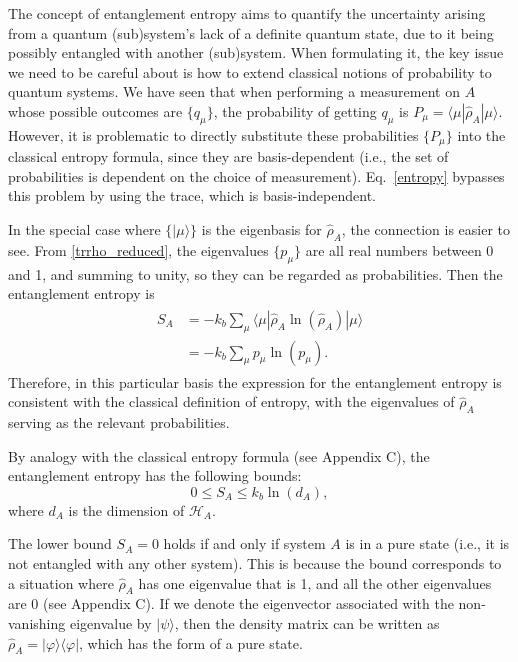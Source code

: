\documentclass[pra,12pt]{revtex4}
\begin{document}
The concept of entanglement entropy aims to quantify the uncertainty
arising from a quantum (sub)system's lack of a definite quantum state,
due to it being possibly entangled with another (sub)system.  When
formulating it, the key issue we need to be careful about is how to
extend classical notions of probability to quantum systems.  We have
seen that when performing a measurement on $A$ whose possible outcomes
are $\{q_\mu\}$, the probability of getting $q_\mu$ is $P_\mu =
\langle \mu | \hat{\rho}_A|\mu\rangle$.  However, it is problematic to
directly substitute these probabilities $\{P_\mu\}$ into the classical
entropy formula, since they are basis-dependent (i.e., the set of
probabilities is dependent on the choice of measurement).
Eq.~\eqref{entropy} bypasses this problem by using the trace, which is
basis-independent.

In the special case where $\{|\mu\rangle\}$ is the eigenbasis for
$\hat{\rho}_A$, the connection is easier to see.  From
\eqref{trrho_reduced}, the eigenvalues $\{p_\mu\}$ are all real numbers
between 0 and 1, and summing to unity, so they can be regarded as
probabilities.  Then the entanglement entropy is
\begin{align}
  \begin{aligned}
    S_A &= -k_b \sum_\mu \langle \mu | \hat{\rho}_A \ln(\hat{\rho}_A) | \mu\rangle  \\
    &= - k_b \sum_\mu p_\mu \ln(p_\mu).
  \end{aligned}
\end{align}
Therefore, in this particular basis the expression for the
entanglement entropy is consistent with the classical definition of
entropy, with the eigenvalues of $\hat{\rho}_A$ serving as the
relevant probabilities.

By analogy with the classical entropy formula (see Appendix C), the
entanglement entropy has the following bounds:
\begin{equation}
  0 \le S_A \le k_b\ln(d_A),
  \label{Sabounds}
\end{equation}
where $d_A$ is the dimension of $\mathscr{H}_A$.

The lower bound $S_A = 0$ holds if and only if system $A$ is in a pure
state (i.e., it is not entangled with any other system).  This is
because the bound corresponds to a situation where $\hat{\rho}_A$ has
one eigenvalue that is 1, and all the other eigenvalues are 0 (see
Appendix C).  If we denote the eigenvector associated with the
non-vanishing eigenvalue by $|\psi\rangle$, then the density matrix
can be written as $\hat{\rho}_A = |\varphi\rangle\langle\varphi|$, which
has the form of a pure state.
\end{document}
